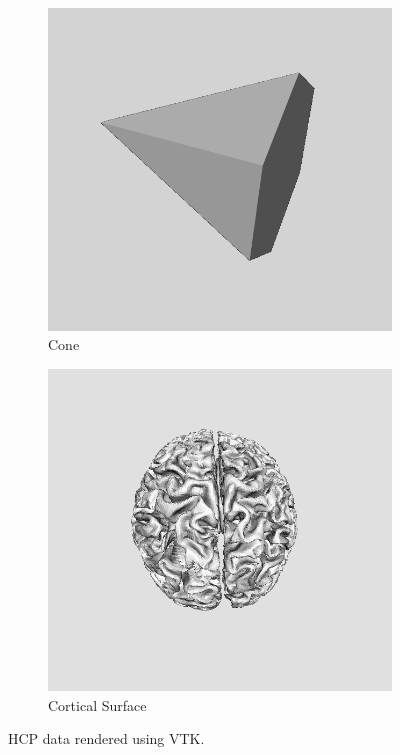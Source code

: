 \documentclass[MSc,paper=a4,pagesize=auto]{icldt}
\begin{document}
\begin{figure}[htbp!]
\centering
\begin{subfigure}{0.5\textwidth}
    \centering
    \includegraphics[width=0.8\linewidth]{resources/cone}
    \caption{Cone}
	\label{fig:sub1}
\end{subfigure}%
\centering
\begin{subfigure}{0.5\textwidth}
    \centering
    \includegraphics[width=0.8\linewidth]{resources/cortical_surface}
    \caption{Cortical Surface}
	\label{fig:sub2}
\end{subfigure}    
    \caption{HCP data rendered using VTK.}
    \label{fig:data_sources}
\end{figure}
\end{document}
